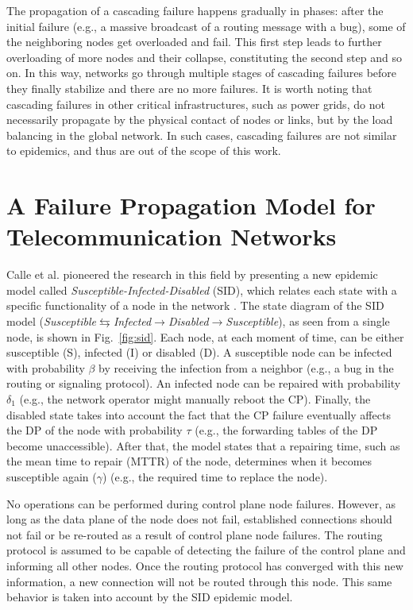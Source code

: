 \documentclass[10pt,draftclsnofoot,onecolumn,journal]{IEEEtran}
\begin{document}
The propagation of a cascading failure happens gradually in phases: after the initial failure (e.g., a massive broadcast of a routing message with a bug), some of the neighboring nodes get overloaded and fail. This first step leads to further overloading of more nodes and their collapse, constituting the second step and so on. In this way, networks go through multiple stages of cascading failures before they finally stabilize and there are no more failures. It is worth noting that cascading failures in other critical infrastructures, such as power grids, do not necessarily propagate by the physical contact of nodes or links, but by the load balancing in the global network. In such cases, cascading failures are not similar to epidemics, and thus are out of the scope of this work.

\section{A Failure Propagation Model for Telecommunication Networks\label{epidemicsontelecom}}

Calle et al. pioneered the research in this field by presenting a new epidemic model called \emph{Susceptible-Infected-Disabled} (SID), which relates each state with a specific functionality of a node in the network \cite{calle2010multiple}. The state diagram of the SID model (\textit{Susceptible$\leftrightarrows$Infected$\rightarrow$Disabled$\rightarrow$Susceptible}), as seen from a single node, is shown in Fig.~\ref{fig:sid}. Each node, at each moment of time, can be either susceptible (S), infected (I) or disabled (D). A susceptible node can be infected with probability $\beta$ by receiving the infection from a neighbor (e.g., a bug in the routing or signaling protocol). An infected node can be repaired with probability $\delta_1$ (e.g., the network operator might manually reboot the CP). Finally, the disabled state takes into account the fact that the CP failure eventually affects the DP of the node with probability $\tau$ (e.g., the forwarding tables of the DP become unaccessible). After that, the model states that a repairing time, such as the mean time to repair (MTTR) of the node, determines when it becomes susceptible again ($\gamma$) (e.g., the required time to replace the node). 

No operations can be performed during control plane node failures. However, as long as the data plane of the node does not fail, established connections should not fail or be re-routed as a result of control plane node failures. The routing protocol is assumed to be capable of detecting the failure of the control plane and informing all other nodes. Once the routing protocol has converged with this new information, a new connection will not be routed through this node. This same behavior is taken into account by the SID epidemic model.
\end{document}
